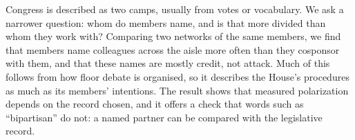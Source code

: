 Congress is described as two camps, usually from votes or vocabulary. We ask a narrower question: whom do members
name, and is that more divided than whom they work with? Comparing two networks of the same members, we find that
members name colleagues across the aisle more often than they cosponsor with them, and that these names are mostly
credit, not attack. Much of this follows from how floor debate is organised, so it describes the House's
procedures as much as its members' intentions. The result shows that measured polarization depends on the record
chosen, and it offers a check that words such as ``bipartisan'' do not: a named partner can be compared with the
legislative record.
